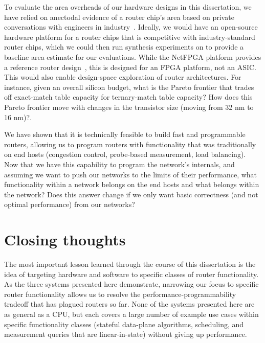  To evaluate the area
overheads of our hardware designs in this dissertation, we have relied on
anectodal evidence of a router chip's area based on private conversations with
engineers in industry~\cite{gibb_parsing}. Ideally, we would have an
open-source hardware platform for a router chips that is competitive with
industry-standard router chips, which we could then run synthesis experiments
on to provide a baseline area estimate for our evaluations. While the NetFPGA
platform provides a reference router design~\cite{netfpga}, this is designed
for an FPGA platform, not an ASIC. This would also enable design-space
exploration of router architectures. For instance, given an overall silicon
budget, what is the Pareto frontier that trades off exact-match table capacity
for ternary-match table capacity? How does this Pareto frontier move with
changes in the transistor size (\eg moving from 32 nm to 16 nm)?.

 We have shown
that it is technically feasible to build fast and programmable routers,
allowing us to program routers with functionality that was traditionally on end
hosts (\eg congestion control, probe-based measurement, load balancing). Now
that we have this capability to program the network's internals, and assuming
we want to push our networks to the limits of their performance, what
functionality within a network belongs on the end hosts and what belongs within
the network?  Does this answer change if we only want basic correctness (and
not optimal performance) from our networks?

\section{Closing thoughts}
The most important lesson learned through the course of this dissertation is
the idea of targeting hardware and software to specific classes of router
functionality. As the three systems presented here demonstrate, narrowing our
focus to specific router functionality allows us to resolve the
performance-programmability tradeoff that has plagued routers so far. None of
the systems presented here are as general as a CPU, but each covers a large
number of example use cases within specific functionality classes (stateful
data-plane algorithms, scheduling, and measurement queries that are
linear-in-state) without giving up performance.

